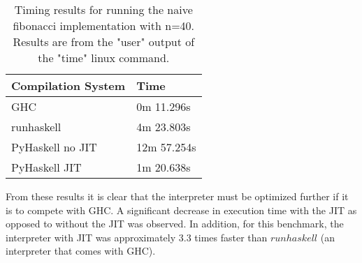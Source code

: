 \begin{table}[H]

\centering
\begin{tabular}{l|l}
\hline
\hline
Compilation System & Time \\
\hline
GHC               & 0m 11.296s  \\
runhaskell        & 4m 23.803s \\ 
PyHaskell no JIT  & 12m 57.254s \\
PyHaskell JIT     & 1m 20.638s \\
\hline
\end{tabular}

\caption{Timing results for running the naive fibonacci implementation with n=40. Results
are from the "user" output of the "time" linux command.}
\label{tab:benchmarks}

\end{table}

From these results it is clear that the interpreter must be optimized further if
it is to compete with GHC. A significant decrease in execution time with the JIT
as opposed to without the JIT was observed. In addition, for this benchmark, the
interpreter with JIT was approximately $3.3$ times faster than $runhaskell$ 
(an interpreter that comes with GHC).



